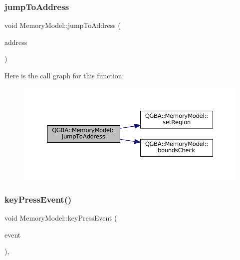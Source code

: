 \subsubsection{\texorpdfstring{jump\+To\+Address}{jumpToAddress}\hspace{0.1cm}{\footnotesize\ttfamily [2/2]}}
{\footnotesize\ttfamily void Memory\+Model\+::jump\+To\+Address (\begin{DoxyParamCaption}\item[{uint32\+\_\+t}]{address }\end{DoxyParamCaption})\hspace{0.3cm}{\ttfamily [slot]}}

Here is the call graph for this function\+:
\nopagebreak
\begin{figure}[H]
\begin{center}
\leavevmode
\includegraphics[width=350pt]{class_q_g_b_a_1_1_memory_model_ad2400bd156a1b4b5f7f275a884ec0f67_cgraph}
\end{center}
\end{figure}
\mbox{\label{class_q_g_b_a_1_1_memory_model_a3a0ea3d2970136697f0b151e58521a2f}} 
\subsubsection{\texorpdfstring{key\+Press\+Event()}{keyPressEvent()}}
{\footnotesize\ttfamily void Memory\+Model\+::key\+Press\+Event (\begin{DoxyParamCaption}\item[{Q\+Key\+Event $\ast$}]{event }\end{DoxyParamCaption})\hspace{0.3cm}{\ttfamily [override]}, {\ttfamily [protected]}}

